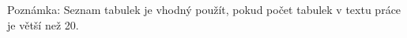 \clearpage
\listoftables
Poznámka: Seznam tabulek je vhodný použít, pokud počet tabulek v textu práce je větší než 20.